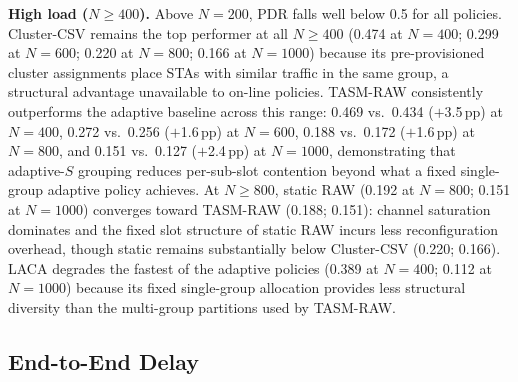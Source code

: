 \documentclass[conference]{IEEEtran}
\begin{document}
\textbf{High load ($N\!\geq\!400$).}
Above $N\!=\!200$, PDR falls well below 0.5 for all policies.
Cluster-CSV remains the top performer at all $N\!\geq\!400$ (0.474 at
$N\!=\!400$; 0.299 at $N\!=\!600$; 0.220 at $N\!=\!800$; 0.166 at
$N\!=\!1000$) because its pre-provisioned cluster assignments place STAs
with similar traffic in the same group, a structural advantage unavailable
to on-line policies.
TASM-RAW consistently outperforms the adaptive baseline across this range:
0.469 vs.\ 0.434 ($+$3.5\,pp) at $N\!=\!400$, 0.272 vs.\ 0.256 ($+$1.6\,pp)
at $N\!=\!600$, 0.188 vs.\ 0.172 ($+$1.6\,pp) at $N\!=\!800$, and
0.151 vs.\ 0.127 ($+$2.4\,pp) at $N\!=\!1000$, demonstrating that
adaptive-$S$ grouping reduces per-sub-slot contention beyond what a fixed
single-group adaptive policy achieves.
At $N\!\geq\!800$, static RAW (0.192 at $N\!=\!800$; 0.151 at $N\!=\!1000$)
converges toward TASM-RAW (0.188; 0.151): channel saturation dominates and
the fixed slot structure of static RAW incurs less reconfiguration overhead,
though static remains substantially below Cluster-CSV (0.220; 0.166).
LACA degrades the fastest of the adaptive policies (0.389 at $N\!=\!400$;
0.112 at $N\!=\!1000$) because its fixed single-group allocation provides
less structural diversity than the multi-group partitions used by TASM-RAW.

\subsection{End-to-End Delay}
\end{document}
